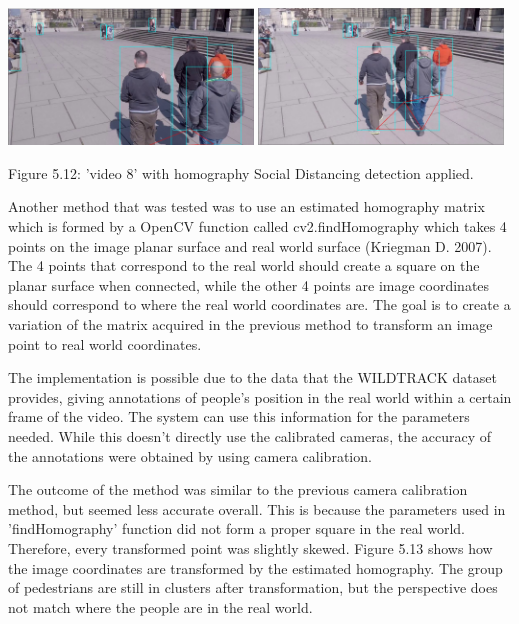 \documentclass[12pt]{report}
\begin{document}
\begin{center}
	\includegraphics[width=65mm]{./images/appendix/HomographyExample1.JPG}
	\includegraphics[width=65mm]{./images/appendix/HomographyExample2.JPG}
	
	{\footnotesize Figure 5.12: 'video 8' with homography Social Distancing detection applied.}
\end{center}

Another method that was tested was to use an estimated homography matrix which is formed by a OpenCV function called cv2.findHomography which takes 4 points on the image planar surface and real world surface (Kriegman D. 2007). The 4 points that correspond to the real world should create a square on the planar surface when connected, while the other 4 points are image coordinates should correspond to where the real world coordinates are. The goal is to create a variation of the matrix acquired in the previous method to transform an image point to real world coordinates.


\vspace{2mm}

The implementation is possible due to the data that the WILDTRACK dataset provides, giving annotations of people's position in the real world within a certain frame of the video. The system can use this information for the parameters needed. While this doesn't directly use the calibrated cameras, the accuracy of the annotations were obtained by using camera calibration.

\vspace{2mm}

The outcome of the method was similar to the previous camera calibration method, but seemed less accurate overall. This is because the parameters used in 'findHomography' function did not form a proper square in the real world. Therefore, every transformed point was slightly skewed. Figure 5.13 shows how the image coordinates are transformed by the estimated homography. The group of pedestrians are still in clusters after transformation, but the perspective does not match where the people are in the real world.
\end{document}
